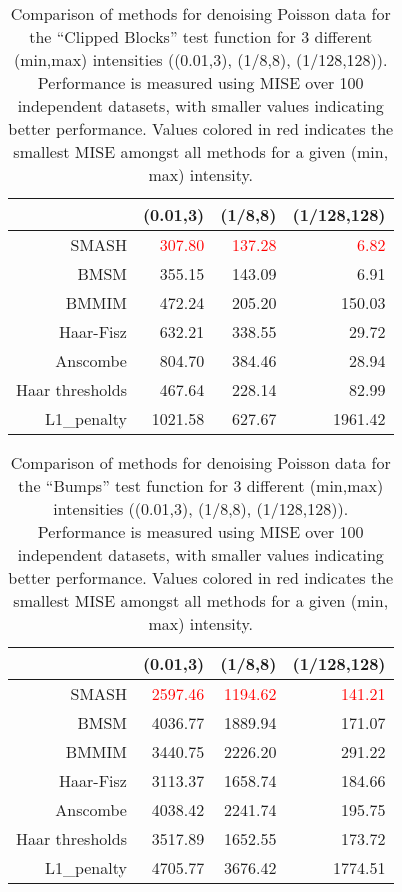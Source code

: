 \documentclass[12pt]{article}
\begin{document}
\begin{table}[ht]
\centering
\begin{tabular}{rrrr}
  \hline
 & (0.01,3) & (1/8,8) & (1/128,128) \\ 
  \hline
SMASH & \textcolor{red}{307.80} & \textcolor{red}{137.28} & \textcolor{red}{6.82} \\ 
  BMSM & 355.15 & 143.09 & 6.91 \\ 
  BMMIM & 472.24 & 205.20 & 150.03 \\ 
  Haar-Fisz & 632.21 & 338.55 & 29.72 \\ 
  Anscombe & 804.70 & 384.46 & 28.94 \\ 
  Haar thresholds & 467.64 & 228.14 & 82.99 \\ 
  L1\_penalty & 1021.58 & 627.67 & 1961.42 \\ 
   \hline
\end{tabular}
\caption{Comparison of methods for denoising Poisson data for the ``Clipped Blocks'' test function for 3 different (min,max) intensities ((0.01,3), (1/8,8), (1/128,128)). Performance is measured using MISE over 100 independent datasets, with smaller values indicating better performance. Values colored in red indicates the smallest MISE amongst all methods for a given (min, max) intensity.} 
\label{table:pois_cb}
\end{table}

\begin{table}[ht]
\centering
\begin{tabular}{rrrr}
  \hline
 & (0.01,3) & (1/8,8) & (1/128,128) \\ 
  \hline
SMASH & \textcolor{red}{2597.46} & \textcolor{red}{1194.62} & \textcolor{red}{141.21} \\ 
  BMSM & 4036.77 & 1889.94 & 171.07 \\ 
  BMMIM & 3440.75 & 2226.20 & 291.22 \\ 
  Haar-Fisz & 3113.37 & 1658.74 & 184.66 \\ 
  Anscombe & 4038.42 & 2241.74 & 195.75 \\ 
  Haar thresholds & 3517.89 & 1652.55 & 173.72 \\ 
  L1\_penalty & 4705.77 & 3676.42 & 1774.51 \\ 
   \hline
\end{tabular}
\caption{Comparison of methods for denoising Poisson data for the ``Bumps'' test function for 3 different (min,max) intensities ((0.01,3), (1/8,8), (1/128,128)). Performance is measured using MISE over 100 independent datasets, with smaller values indicating better performance. Values colored in red indicates the smallest MISE amongst all methods for a given (min, max) intensity.} 
\label{table:pois_b}
\end{table}
\end{document}

